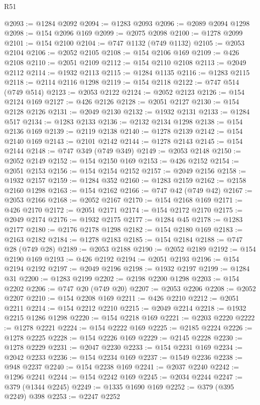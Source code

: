 \begin{lexlean}{R51}
\begin{coremodule}
@2093 := @1284 @2092
@2094 := @1283 @2093
@2096 := @2089 @2094 @1298
@2098 := @154 @2096 @169
@2099 := @2075 @2098
@2100 := @1278 @2099
@2101 := @154 @2100
@2104 := @747 @1132 (@749 @1132)
@2105 := @2053 @2104
@2106 := @2052 @2105
@2108 := @154 @2106 @169
@2109 := @426 @2108
@2110 := @2051 @2109
@2112 := @154 @2110 @2108
@2113 := @2049 @2112
@2114 := @1932 @2113
@2115 := @1284 @1135
@2116 := @1283 @2115
@2118 := @2114 @2116 @1298
@2119 := @154 @2118
@2122 := @747 @514 (@749 @514)
@2123 := @2053 @2122
@2124 := @2052 @2123
@2126 := @154 @2124 @169
@2127 := @426 @2126
@2128 := @2051 @2127
@2130 := @154 @2128 @2126
@2131 := @2049 @2130
@2132 := @1932 @2131
@2133 := @1284 @517
@2134 := @1283 @2133
@2136 := @2132 @2134 @1298
@2138 := @154 @2136 @169
@2139 := @2119 @2138
@2140 := @1278 @2139
@2142 := @154 @2140 @169
@2143 := @2101 @2142
@2144 := @1278 @2143
@2145 := @154 @2144
@2148 := @747 @349 (@749 @349)
@2149 := @2053 @2148
@2150 := @2052 @2149
@2152 := @154 @2150 @169
@2153 := @426 @2152
@2154 := @2051 @2153
@2156 := @154 @2154 @2152
@2157 := @2049 @2156
@2158 := @1932 @2157
@2159 := @1284 @352
@2160 := @1283 @2159
@2162 := @2158 @2160 @1298
@2163 := @154 @2162
@2166 := @747 @42 (@749 @42)
@2167 := @2053 @2166
@2168 := @2052 @2167
@2170 := @154 @2168 @169
@2171 := @426 @2170
@2172 := @2051 @2171
@2174 := @154 @2172 @2170
@2175 := @2049 @2174
@2176 := @1932 @2175
@2177 := @1284 @45
@2178 := @1283 @2177
@2180 := @2176 @2178 @1298
@2182 := @154 @2180 @169
@2183 := @2163 @2182
@2184 := @1278 @2183
@2185 := @154 @2184
@2188 := @747 @28 (@749 @28)
@2189 := @2053 @2188
@2190 := @2052 @2189
@2192 := @154 @2190 @169
@2193 := @426 @2192
@2194 := @2051 @2193
@2196 := @154 @2194 @2192
@2197 := @2049 @2196
@2198 := @1932 @2197
@2199 := @1284 @31
@2200 := @1283 @2199
@2202 := @2198 @2200 @1298
@2203 := @154 @2202
@2206 := @747 @20 (@749 @20)
@2207 := @2053 @2206
@2208 := @2052 @2207
@2210 := @154 @2208 @169
@2211 := @426 @2210
@2212 := @2051 @2211
@2214 := @154 @2212 @2210
@2215 := @2049 @2214
@2218 := @1932 @2215 @1286 @1298
@2220 := @154 @2218 @169
@2221 := @2203 @2220
@2222 := @1278 @2221
@2224 := @154 @2222 @169
@2225 := @2185 @2224
@2226 := @1278 @2225
@2228 := @154 @2226 @169
@2229 := @2145 @2228
@2230 := @1278 @2229
@2231 := @2047 @2230
@2233 := @154 @2231 @169
@2234 := @2042 @2233
@2236 := @154 @2234 @169
@2237 := @1549 @2236
@2238 := @948 @2237
@2240 := @154 @2238 @169
@2241 := @2037 @2240
@2242 := @1296 @2241
@2244 := @154 @2242 @169
@2245 := @2034 @2244
@2247 := @379 (@1344 @2245)
@2249 := @1335 @1690 @169
@2252 := @379 (@395 @2249) @398
@2253 := @2247 @2252

\end{coremodule}
\end{lexlean}
